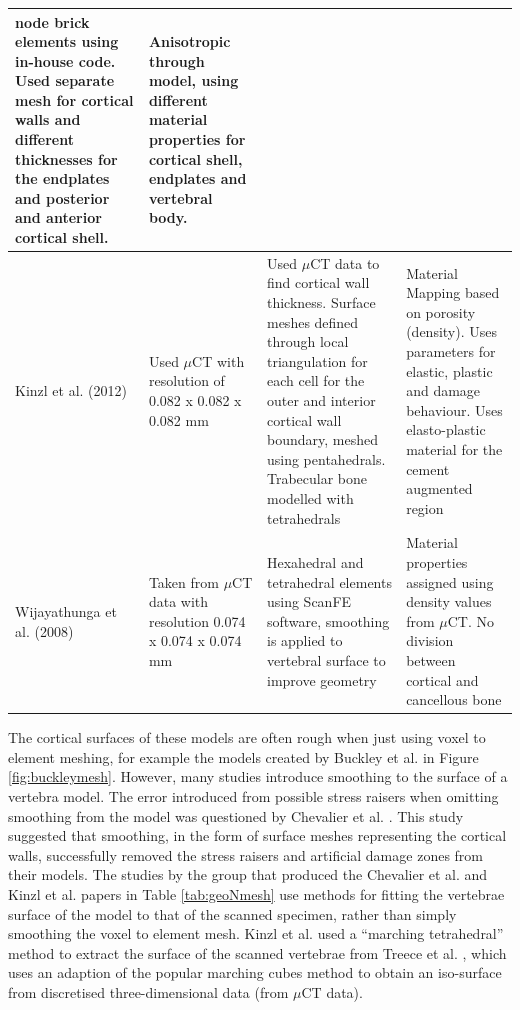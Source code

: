 \begin{landscape}
\begin{longtable}{P{0.2\textheight}|P{0.2\textheight}|P{0.7\textheight}|P{0.5\textheight}}
node brick elements using in-house code. Used separate mesh for cortical
walls and different thicknesses for the endplates and posterior and
anterior cortical shell. & Anisotropic through model, using different
material properties for cortical shell, endplates and vertebral
body.\\
\hline
Kinzl et al. (2012) \cite{Kinzl2012} & Used $\mu$CT with resolution of 0.082 x 0.082 x
0.082 mm & Used $\mu$CT data to find cortical wall thickness. Surface meshes
defined through local triangulation for each cell for the outer and
interior cortical wall boundary, meshed using pentahedrals. Trabecular
bone modelled with tetrahedrals & Material Mapping based on porosity
(density). Uses parameters for elastic, plastic and damage behaviour.
Uses elasto-plastic material for the cement augmented
region\\
\hline
Wijayathunga et al. (2008) \cite{Wijayathunga2008} & Taken from $\mu$CT data with
resolution 0.074
x 0.074 x 0.074 mm & Hexahedral and tetrahedral elements using ScanFE
software, smoothing is applied to vertebral surface to improve geometry
& Material properties assigned using density values from $\mu$CT. No
division between cortical and cancellous bone\\


\end{longtable}

\end{landscape}

The cortical surfaces of these models are often rough when just using
voxel to element meshing, for example the models created by Buckley et
al. \cite{Buckley2006} in Figure \ref{fig:buckleymesh}. However, many
studies
introduce
smoothing
to
the surface of a vertebra model. The error introduced from possible
stress raisers when omitting smoothing from the model was questioned by
Chevalier et al. \cite{Chevalier2009}. This study suggested that smoothing, in
the
form of surface meshes representing the cortical walls, successfully
removed the stress raisers and artificial damage zones from their
models. The studies by the group that produced the Chevalier et al. and
Kinzl et al. papers in Table \ref{tab:geoNmesh} use methods for fitting
the vertebrae
surface of the model to that of the scanned specimen, rather than simply
smoothing the voxel to element mesh. Kinzl et al. \cite{Kinzl2012} used a
``marching tetrahedral'' method to extract the surface of the scanned
vertebrae from Treece et al. \cite{Treece1999}, which uses an adaption of the
popular marching cubes method to obtain an iso-surface from discretised
three-dimensional data (from $\mu$CT data).

